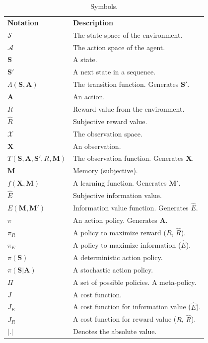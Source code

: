\begin{table}[]
	\caption{Symbols.}
    \begin{tabular}{ll}
	\textbf{Notation} & \textbf{Description} \\
    $\mathcal{S}$ & The state space of the environment. \\
    $\mathcal{A}$ & The action space of the agent. \\
    $\mathbf{S}$ & A state. \\
    $\mathbf{S'}$ & A next state in a sequence. \\
    $\Lambda(\mathbf{S},\mathbf{A})$ & The transition function. Generates $\mathbf{S'}$. \\
    $\mathbf{A}$ & An action. \\
    $R$ & Reward value from the environment. \\
    $\hat R$ & Subjective reward value. \\
    $\mathcal{X}$ & The observation space. \\
    $\mathbf{X}$ & An observation. \\
    $T(\mathbf{S},\mathbf{A},\mathbf{S'},R,\mathbf{M})$ & The observation function. Generates $\mathbf{X}$. \\
    $\mathbf{M}$ & Memory (subjective). \\
    $f(\mathbf{\mathbf{X},M})$ & A learning function. Generates $\mathbf{M'}$. \\
    $\hat E$ & Subjective information value. \\
    $E(\mathbf{M},\mathbf{M'})$ & Information value function. Generates $\hat E$. \\
    $\pi$ & An action policy. Generates $\mathbf{A}$. \\
    $\pi_R$ & A policy to maximize reward ($R$, $\hat R$). \\
    $\pi_E$ & A policy to maximize information ($\hat E$). \\
    $\pi(\mathbf{S})$ & A deterministic action policy. \\
    $\pi(\mathbf{S}|\mathbf{A})$ & A stochastic action policy. \\
    $\Pi$ & A set of possible policies. A meta-policy. \\
    $J$ & A cost function. \\
    $J_E$ & A cost function for information value ($\hat E$). \\
    $J_R$ & A cost function for reward value ($R$, $\hat R$). \\
    $|.|$ & Denotes the absolute value. \\

\end{tabular}
\end{table}
